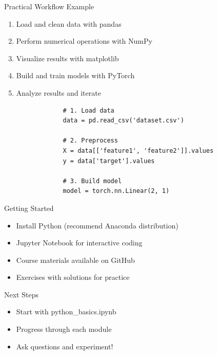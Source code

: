 \documentclass{beamer}
\begin{document}
	\begin{frame}[fragile]{Practical Workflow Example}
		\begin{enumerate}
			\item Load and clean data with pandas
			\item Perform numerical operations with NumPy
			\item Visualize results with matplotlib
			\item Build and train models with PyTorch
			\item Analyze results and iterate
		\end{enumerate}
		
		\begin{example}[AI workflow]
			\begin{lstlisting}
				# 1. Load data
				data = pd.read_csv('dataset.csv')
				
				# 2. Preprocess
				X = data[['feature1', 'feature2']].values
				y = data['target'].values
				
				# 3. Build model
				model = torch.nn.Linear(2, 1)
			\end{lstlisting}
		\end{example}
	\end{frame}
	
	\begin{frame}{Getting Started}
		\begin{itemize}
			\item Install Python (recommend Anaconda distribution)
			\item Jupyter Notebook for interactive coding
			\item Course materials available on GitHub
			\item Exercises with solutions for practice
		\end{itemize}
		
		\begin{block}{Next Steps}
			\begin{itemize}
				\item Start with python\_basics.ipynb
				\item Progress through each module
				\item Ask questions and experiment!
			\end{itemize}
		\end{block}
	\end{frame}
	
\end{document}
